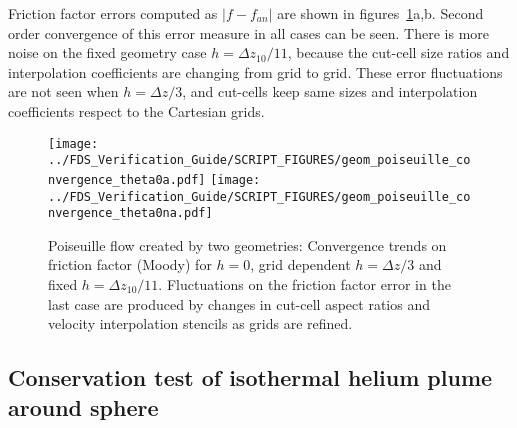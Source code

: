 \documentclass[12pt]{article}
\begin{document}
Friction factor errors computed as $|f-f_{an}|$ are shown in figures~\ref{Fig:PoiseConvg}a,b. Second order convergence of this error measure in all cases can be seen.
There is more noise on the fixed geometry case $h=\Delta z_{10}/11$, because the cut-cell size ratios and interpolation coefficients are changing from grid to grid. These error fluctuations are not seen when $h=\Delta z /3$, and cut-cells keep same sizes and interpolation coefficients respect to the Cartesian grids.
%
\begin{figure}[h]
      \centering
      \texttt{[image: ../FDS\_Verification\_Guide/SCRIPT\_FIGURES/geom\_poiseuille\_convergence\_theta0a.pdf]}
      \texttt{[image: ../FDS\_Verification\_Guide/SCRIPT\_FIGURES/geom\_poiseuille\_convergence\_theta0na.pdf]}
      \caption{Poiseuille flow created by two geometries: Convergence trends on friction factor (Moody) for $h=0$, grid dependent $h=\Delta z/3$ and fixed $h=\Delta z_{10}/11$. Fluctuations on the friction factor error in the last case are produced by changes in cut-cell aspect ratios and velocity interpolation stencils as grids are refined.}
      \label{Fig:PoiseConvg}
\end{figure}
%


\subsection{Conservation test of isothermal helium plume around sphere}
\end{document}
